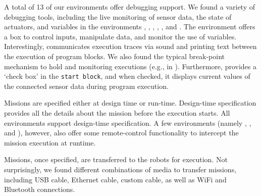  A total of 13 of our environments offer debugging support. We found a variety of debugging tools, including the live monitoring of sensor data, the state of actuators, and variables in the environments \picaxe, \aseba, \trik, \flyaq, \easyc, and \edison. The \edison environment  offers a box to control inputs, manipulate data, and monitor the use of variables. %
Interestingly, \makecode communicates execution traces via sound and printing text between the execution of program blocks. %
We also found the typical break-point mechanism to hold and monitoring executions (e.g., in \robotmesh).
Furthermore, \openroberta provides a `check box' in the \texttt{start block}, and when checked, it displays current values of the connected sensor data during program execution. %

 Missions are specified either at design time or run-time. Design-time specification provides all the details about the mission before the execution starts.
All environments support design-time specification. A few environments (namely \turtlebot, \sphero, and \choregraphe), however, also offer some remote-control functionality to intercept the mission execution at runtime. %

 Missions, once specified, are transferred to the robots for execution. Not surprisingly, we found different combinations of media to transfer missions, including USB cable, Ethernet cable, custom cable, as well as WiFi and Bluetooth connections.


